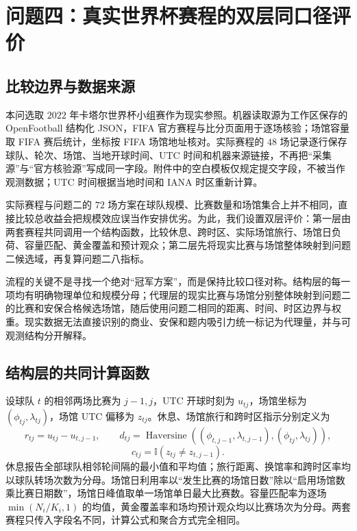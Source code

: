 \section{问题四：真实世界杯赛程的双层同口径评价}

\subsection{比较边界与数据来源}

本问选取 $2022$ 年卡塔尔世界杯小组赛作为现实参照。机器读取源为工作区保存的 OpenFootball 结构化 JSON，FIFA 官方赛程与比分页面用于逐场核验；场馆容量取 FIFA 赛后统计，坐标按 FIFA 场馆地址核对。实际赛程的 $48$ 场记录逐行保存球队、轮次、场馆、当地开球时间、UTC 时间和机器来源链接，不再把“采集源”与“官方核验源”写成同一字段。附件中的空白模板仅规定提交字段，不被当作观测数据；UTC 时间根据当地时间和 IANA 时区重新计算。

实际赛程与问题二的 $72$ 场方案在球队规模、比赛数量和场馆集合上并不相同，直接比较总收益会把规模效应误当作安排优劣。为此，我们设置双层评价：第一层由两套赛程共同调用一个结构函数，比较休息、跨时区、实际场馆旅行、场馆日负荷、容量匹配、黄金覆盖和预计观众；第二层先将现实比赛与场馆整体映射到问题二候选域，再复算问题二八指标。

流程的关键不是寻找一个绝对“冠军方案”，而是保持比较口径对称。结构层的每一项均有明确物理单位和规模分母；代理层的现实比赛与场馆分别整体映射到问题二的比赛和安保合格候选场馆，随后使用问题二相同的距离、时间、时区边界与权重。现实数据无法直接识别的商业、安保和题内吸引力统一标记为代理量，并与可观测结构分开解释。

\subsection{结构层的共同计算函数}

设球队 $t$ 的相邻两场比赛为 $j-1,j$，UTC 开球时刻为 $u_{tj}$，场馆坐标为 $(\phi_{tj},\lambda_{tj})$，场馆 UTC 偏移为 $z_{tj}$。休息、场馆旅行和跨时区指示分别定义为
\begin{equation}
r_{tj}=u_{tj}-u_{t,j-1},\qquad
d_{tj}=\operatorname{Haversine}\!\left((\phi_{t,j-1},\lambda_{t,j-1}),(\phi_{tj},\lambda_{tj})\right),
\end{equation}
\begin{equation}
c_{tj}=\mathbb I\!\left(z_{tj}\ne z_{t,j-1}\right).
\end{equation}
休息报告全部球队相邻轮间隔的最小值和平均值；旅行距离、换馆率和跨时区率均以球队转场次数为分母。场馆日利用率以“发生比赛的场馆日数”除以“启用场馆数乘比赛日期数”，场馆日峰值取单一场馆单日最大比赛数。容量匹配率为逐场 $\min(N_i/K_i,1)$ 的均值，黄金覆盖率和场均预计观众均以比赛场次为分母。两套赛程只传入字段名不同，计算公式和聚合方式完全相同。

